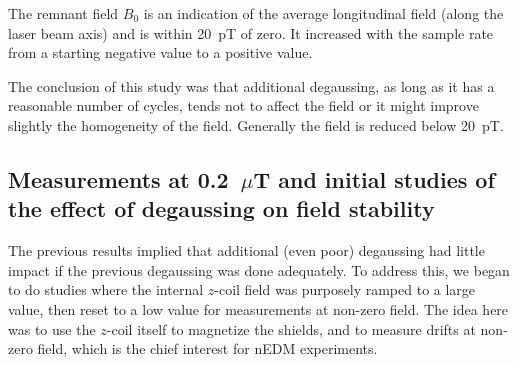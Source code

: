 The remnant field $B_0$ is an indication of the average longitudinal
field (along the laser beam axis) and is within 20~pT of zero.  It
increased with the sample rate from a starting negative value to a
positive value.

The conclusion of this study was that additional degaussing, as long
as it has a reasonable number of cycles, tends not to affect the field
or it might improve slightly the homogeneity of the field.  Generally
the field is reduced below 20~pT.



\subsection{Measurements at 0.2~$\mu$T and initial studies of the effect of degaussing on field stability\label{sec:three-degauss}}

The previous results implied that additional (even poor) degaussing
had little impact if the previous degaussing was done adequately.  To
address this, we began to do studies where the internal $z$-coil field
was purposely ramped to a large value, then reset to a low value for
measurements at non-zero field.  The idea here was to use the $z$-coil
itself to magnetize the shields, and to measure drifts at non-zero
field, which is the chief interest for nEDM experiments.


